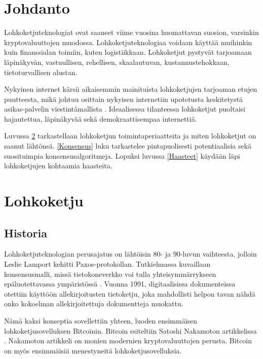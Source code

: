 \documentclass[utf8,bachelor]{gradu3}
\begin{document}
\mainmatter

\chapter{Johdanto}

Lohkoketjuteknologiat ovat saaneet viime vuosina huomattavan suosion, varsinkin kryptovaluuttojen muodossa. Lohkoketjuteknologiaa voidaan käyttää muihinkin kuin finanssialan toimiin, kuten logistiikkaan. 
Lohkoketjut pystyvät tarjoamaan läpinäkyvän, vastuullisen, rehellisen, skaalautuvan, kustannustehokkaan, tietoturvallisen alustan.

Nykyinen internet kärsii aikaisemmin mainituista lohkoketjujen tarjoaman etujen puutteesta, mikä johtuu osittain nykyisen internetiin upotetusta keskitetystä asikas-palvelin viestintämallista \parencite{zarrin2021blockchain}.
Ideaalisessa tilanteessa lohkoketjut puoltaisi hajautettua, läpinäkyvää sekä demokraattisempaa internettiä.



Luvussa \ref{Lohkoketju} tarkastellaan lohkoketjun toimintaperiaatteita ja miten lohkoketjut on saanut lähtönsä.
\ref{Konsensus} luku tarkastelee pintapuolisesti potentiaalisia sekä suosituimpia konsensusalgoritmeja.
Lopuksi luvussa \ref{Haasteet} käydään läpi lohkoketjujen kohtaamia haasteita.



\chapter{Lohkoketju}\label{Lohkoketju}
\section{Historia}

Lohkoketjuteknologian perusajatus on lähtöisin 80- ja 90-luvun vaihteesta, jolloin Leslie Lamport kehitti Paxos-protokollan. 
Tutkielmassa kuvaillaan konsensusmalli, missä tietokoneverkko voi tulla yhteisymmärrykseen epäluotettavassa ympäristössä \parencite{lamport2019part}. 
Vuonna 1991, digitaalisissa dokumenteissa otettiin käyttöön allekirjoitusten tietoketju, joka mahdollisti helpon tavan nähdä onko kokoelman allekirjoitettuja dokumentteja muokattu.

Nämä kaksi konseptia sovellettiin yhteen, luoden ensimmäisen lohkoketjusovelluksen Bitcoinin. Bitcoin esiteltiin Satoshi Nakamoton artikkelissa \parencite{nakamoto2008bitcoin}.
Nakamoton artikkeli on monien modernien kryptovaluuttojen perusta.
Bitcoin on myös ensimmäisiä menestyneitä lohkoketjusovelluksia.
\end{document}
